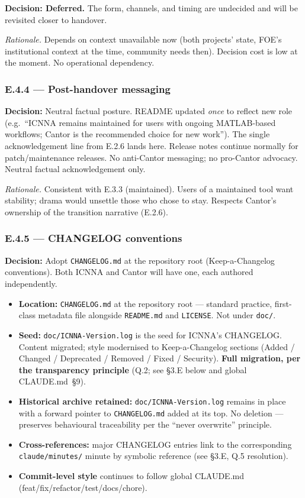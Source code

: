 \documentclass[11pt,a4paper]{article}
\begin{document}
\textbf{Decision: Deferred.} The form, channels, and timing are undecided and will be revisited closer to handover.

\textit{Rationale.} Depends on context unavailable now (both projects' state, FOE's institutional context at the time, community needs then). Decision cost is low at the moment. No operational dependency.

\subsubsection{E.4.4 --- Post-handover messaging}

\textbf{Decision:} Neutral factual posture. README updated \emph{once} to reflect new role (e.g.\ ``ICNNA remains maintained for users with ongoing MATLAB-based workflows; Cantor is the recommended choice for new work''). The single acknowledgement line from E.2.6 lands here. Release notes continue normally for patch/maintenance releases. No anti-Cantor messaging; no pro-Cantor advocacy. Neutral factual acknowledgement only.

\textit{Rationale.} Consistent with E.3.3 (maintained). Users of a maintained tool want stability; drama would unsettle those who chose to stay. Respects Cantor's ownership of the transition narrative (E.2.6).

\subsubsection{E.4.5 --- CHANGELOG conventions}

\textbf{Decision:} Adopt \texttt{CHANGELOG.md} at the repository root (Keep-a-Changelog conventions). Both ICNNA and Cantor will have one, each authored independently.

\begin{itemize}
    \item \textbf{Location:} \texttt{CHANGELOG.md} at the repository root --- standard practice, first-class metadata file alongside \texttt{README.md} and \texttt{LICENSE}. Not under \texttt{doc/}.
    \item \textbf{Seed:} \texttt{doc/ICNNA-Version.log} is the seed for ICNNA's CHANGELOG. Content migrated; style modernised to Keep-a-Changelog sections (Added / Changed / Deprecated / Removed / Fixed / Security). \textbf{Full migration, per the transparency principle} (Q.2; see §3.E below and global CLAUDE.md~§9).
    \item \textbf{Historical archive retained:} \texttt{doc/ICNNA-Version.log} remains in place with a forward pointer to \texttt{CHANGELOG.md} added at its top. No deletion --- preserves behavioural traceability per the ``never overwrite'' principle.
    \item \textbf{Cross-references:} major CHANGELOG entries link to the corresponding \texttt{claude/minutes/} minute by symbolic reference (see §3.E, Q.5 resolution).
    \item \textbf{Commit-level style} continues to follow global CLAUDE.md (feat/fix/refactor/test/docs/chore).
\end{itemize}
\end{document}
